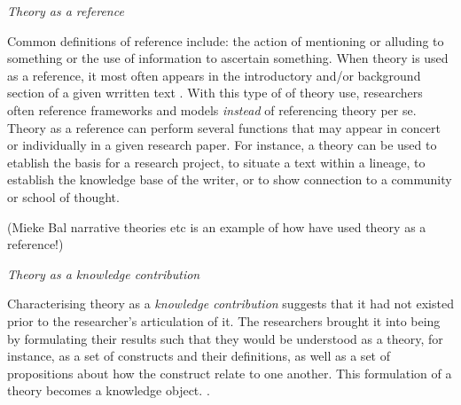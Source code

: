 \par \emph{Theory as a reference} \par
Common definitions of reference include: the action of mentioning or alluding to something or the use of information to ascertain something. When theory is used as a reference, it most often appears in the introductory and/or background section of a given wrritten text \autocite[p. 128]{beck_examining_2016}. With this type of of theory use, researchers often reference frameworks and models \emph{instead} of referencing theory per se. Theory as a reference can perform several functions that may appear in concert or individually in a given research paper. For instance, a theory can be used to etablish the basis for a research project, to situate a text within a lineage, to establish the knowledge base of the writer, or to show connection to a community or school of thought. 
\par
(Mieke Bal narrative theories etc is an example of how  have used theory as a reference!)

\par \emph{Theory as a knowledge contribution} \par
Characterising theory as a \emph{knowledge contribution} suggests that it had not existed prior to the researcher's articulation of it. The researchers brought it into being by formulating their results such that they would be understood as a theory, for instance, as a set of constructs and their definitions, as well as a set of propositions about how the construct relate to one another. This formulation of a theory becomes a knowledge object. \autocite[p. 128]{beck_examining_2016}.



